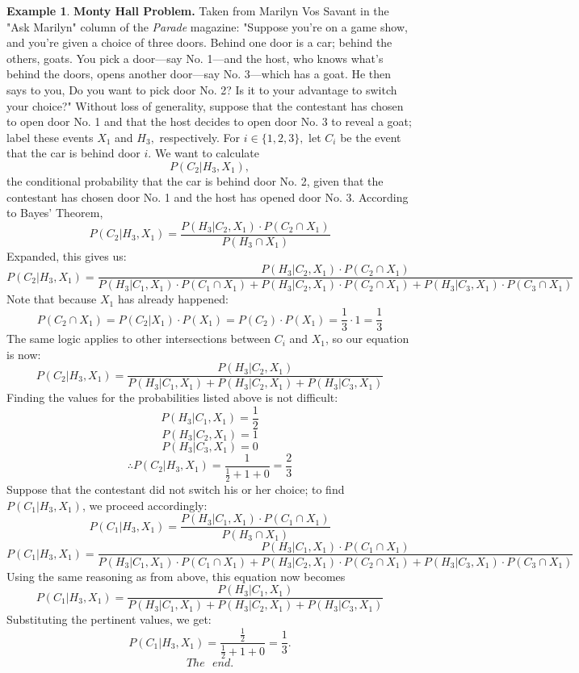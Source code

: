 \documentclass[a4paper]{article}
\theoremstyle{definition}
\newtheorem{exmp}{Example}[section]
\begin{document}
\begin{exmp}
\textbf{Monty Hall Problem.}
Taken from Marilyn Vos Savant in the "Ask Marilyn" column of the \textit{Parade} magazine:
\bigbreak "Suppose you're on a game show, and you're given a choice of three doors. Behind one door is a car; behind the others, goats. You pick a door—say No. 1—and the host, who knows what's behind the doors, opens another door—say No. 3—which has a goat. He then says to you, Do you want to pick door No. 2? Is it to your advantage to switch your choice?"
\bigbreak
Without loss of generality, suppose that the contestant has chosen to open door No. 1 and that the host decides to open door No. 3 to reveal a goat; label these events $X_1$ and $H_3,$ respectively. For $i \in \{1,2,3\},$ let $C_i$ be the event that the car is behind door $i$. We want to calculate $$P(C_2|H_3,X_1),$$
the conditional probability that the car is behind door No. 2, given that the contestant has chosen door No. 1 and the host has opened door No. 3. According to Bayes' Theorem,
$$P(C_2|H_3,X_1) = \frac{P(H_3|C_2,X_1)\cdot P(C_2 \cap X_1)}{P(H_3 \cap X_1)}$$
Expanded, this gives us:
$$P(C_2|H_3,X_1) = \frac{P(H_3|C_2,X_1)\cdot P(C_2 \cap X_1)}{P(H_3|C_1,X_1)\cdot P(C_1 \cap X_1)+P(H_3|C_2,X_1)\cdot P(C_2 \cap X_1)+P(H_3|C_3,X_1)\cdot P(C_3\cap X_1)}$$
Note that because $X_1$ has already happened:
$$P(C_2 \cap X_1)=P(C_2|X_1)\cdot P(X_1)=P(C_2)\cdot P(X_1) = \frac{1}{3} \cdot 1 = \frac{1}{3}$$
The same logic applies to other intersections between $C_i$ and $X_1$, so our equation is now:
$$P(C_2|H_3,X_1) = \frac{P(H_3|C_2,X_1)}{P(H_3|C_1,X_1)+P(H_3|C_2,X_1)+P(H_3|C_3,X_1)}$$
Finding the values for the probabilities listed above is not difficult:
$$P(H_3|C_1,X_1)=\frac1{2}$$
$$P(H_3|C_2,X_1)=1$$
$$P(H_3|C_3,X_1)=0$$
$$\therefore P(C_2|H_3,X_1) = \frac{1}{\frac1{2}+1+0} = \frac{2}{3}$$
Suppose that the contestant did not switch his or her choice; to find $P(C_1|H_3,X_1)$, we proceed accordingly:
$$P(C_1|H_3,X_1) = \frac{P(H_3|C_1,X_1)\cdot P(C_1 \cap X_1)}{P(H_3 \cap X_1)}$$
$$P(C_1|H_3,X_1) = \frac{P(H_3|C_1,X_1)\cdot P(C_1 \cap X_1)}{P(H_3|C_1,X_1)\cdot P(C_1 \cap X_1)+P(H_3|C_2,X_1)\cdot P(C_2 \cap X_1)+P(H_3|C_3,X_1)\cdot P(C_3\cap X_1)}$$
Using the same reasoning as from above, this equation now becomes 
$$P(C_1|H_3,X_1) = \frac{P(H_3|C_1,X_1)}{P(H_3|C_1,X_1)+P(H_3|C_2,X_1)+P(H_3|C_3,X_1)}$$
Substituting the pertinent values, we get:
$$P(C_1|H_3,X_1) = \frac{\frac1{2}}{\frac1{2}+1+0} = \frac1{3}.$$
\bigbreak
\bigbreak
$$The \text{ } end.$$
\end{exmp}
\end{document}
